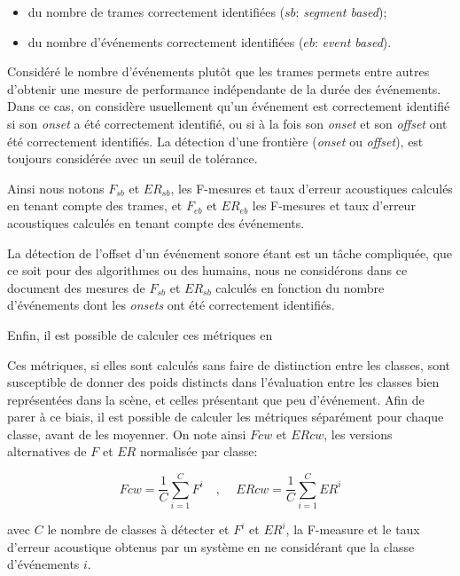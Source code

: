 \begin{itemize}
\item du nombre de trames correctement identifiées ($sb$: \emph{segment based});
\item du nombre d'événements correctement identifiées ($eb$: \emph{event based}).
\end{itemize}

Considéré le nombre d'événements plutôt que les trames permets entre autres d'obtenir une mesure de performance indépendante de la durée des événements. Dans ce cas, on considère usuellement qu'un événement est correctement identifié si son \emph{onset} a été correctement identifié, ou si à la fois son \emph{onset} et son \emph{offset} ont été correctement identifiés. La détection d'une frontière (\emph{onset} ou \emph{offset}), est toujours considérée avec un seuil de tolérance.

Ainsi nous notons $F_{sb}$ et $ER_{sb}$, les F-mesures et taux d'erreur acoustiques calculés en tenant compte des trames, et $F_{eb}$ et $ER_{eb}$ les F-mesures et taux d'erreur acoustiques calculés en tenant compte des événements.

La détection de l'offset d'un événement sonore étant est un tâche compliquée, que ce soit pour des algorithmes ou des humains, nous ne considérons dans ce document des mesures de $F_{sb}$ et $ER_{sb}$ calculés en fonction du nombre d'événements dont les \emph{onsets} ont été correctement identifiés.

Enfin, il est possible de calculer ces métriques en 

Ces métriques, si elles sont calculés sans faire de distinction entre les classes, sont susceptible de donner des poids distincts dans l'évaluation entre les classes bien représentées dans la scène, et celles présentant que peu d'événement. Afin de parer à ce biais, il est possible de calculer les métriques séparément pour chaque classe, avant de les moyenner. On note ainsi $Fcw$ et $ERcw$, les versions alternatives de $F$ et $ER$ normalisée par classe:

\begin{equation}
\label{eq:ch7_eq3}
Fcw=\dfrac{1}{C}\sum_{i=1}^C F^i \quad \textrm{, } \quad ERcw=\dfrac{1}{C}\sum_{i=1}^C ER^i
\end{equation}

avec $C$ le nombre de classes à détecter et $F^i$ et $ER^i$, la F-measure et le taux d'erreur acoustique obtenus par un système en ne considérant que la classe d'événements $i$. 

